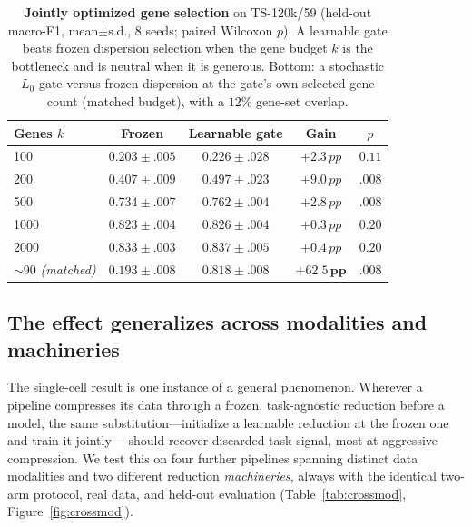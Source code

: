 \documentclass[10pt,twocolumn]{article}
\newcommand{\pp}{\,pp}
\begin{document}
\begin{table}[t]
\centering\small
\caption{\textbf{Jointly optimized gene selection} on TS-120k/59 (held-out macro-F1,
mean$\pm$s.d., 8 seeds; paired Wilcoxon $p$). A learnable gate beats frozen dispersion
selection when the gene budget $k$ is the bottleneck and is neutral when it is generous. Bottom:
a stochastic $L_0$ gate versus frozen dispersion at the gate's own selected gene count
(matched budget), with a $12\%$ gene-set overlap.}
\label{tab:geneselect}
\begin{tabular}{@{}lcccc@{}}
\toprule
Genes $k$ & Frozen & Learnable gate & Gain & $p$ \\
\midrule
100  & $0.203{\pm}.005$ & $0.226{\pm}.028$ & $+2.3\pp$ & $0.11$ \\
200  & $0.407{\pm}.009$ & $0.497{\pm}.023$ & $+9.0\pp$ & $\mathbf{.008}$ \\
500  & $0.734{\pm}.007$ & $0.762{\pm}.004$ & $+2.8\pp$ & $\mathbf{.008}$ \\
1000 & $0.823{\pm}.004$ & $0.826{\pm}.004$ & $+0.3\pp$ & $0.20$ \\
2000 & $0.833{\pm}.003$ & $0.837{\pm}.005$ & $+0.4\pp$ & $0.20$ \\
\midrule
$\sim$90 \emph{(matched)} & $0.193{\pm}.008$ & $\mathbf{0.818{\pm}.008}$ & $\mathbf{+62.5\pp}$ & $\mathbf{.008}$ \\
\bottomrule
\end{tabular}
\end{table}

\subsection{The effect generalizes across modalities and machineries}
\label{sec:crossmodality}

The single-cell result is one instance of a general phenomenon. Wherever a pipeline
compresses its data through a frozen, task-agnostic reduction before a model, the same
substitution---initialize a learnable reduction at the frozen one and train it jointly---
should recover discarded task signal, most at aggressive compression. We test this on four
further pipelines spanning distinct data modalities and two different reduction
\emph{machineries}, always with the identical two-arm protocol, real data, and held-out
evaluation (Table~\ref{tab:crossmod}, Figure~\ref{fig:crossmod}).
\end{document}
